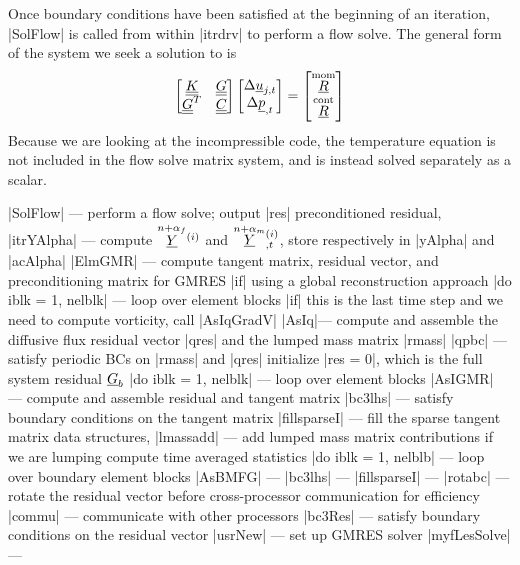 \documentclass[11pt]{article}
\begin{document}
Once boundary conditions have been satisfied at the beginning of an iteration, |SolFlow| is called from within |itrdrv| to perform a flow solve. The general form of the system we seek a solution to is
\begin{equation}
\begin{bmatrix}
\uul{K}   & \uul{G} \\
\uul{G}^T & \uul{C}
\end{bmatrix}
\begin{bmatrix}
\Delta \ul{u}_{j,t} \\
\Delta \ul{p}_{,t}
\end{bmatrix}
=
\begin{bmatrix}
\oset{\text{mom}}{\ul{R}} \\
\oset{\text{cont}}{\ul{R}}
\end{bmatrix}
\end{equation}
Because we are looking at the incompressible code, the temperature equation is not included in the flow solve matrix system, and is instead solved separately as a scalar.
\begin{outline}[deep]
\1 |SolFlow| --- perform a flow solve; output |res| preconditioned residual, 
	\2 |itrYAlpha| --- compute $\oset{n+\alpha_f}{\ul{Y}}^{(i)}$ and $\oset{n+\alpha_m}{\ul{Y}}^{(i)}_{,t}$, store respectively in |yAlpha| and |acAlpha|
	\2 |ElmGMR| --- compute tangent matrix, residual vector, and preconditioning matrix for GMRES
		\3 |if| using a global reconstruction approach
			\4 |do iblk = 1, nelblk| --- loop over element blocks
				\5 |if| this is the last time step and we need to compute vorticity, call |AsIqGradV|
				\5 |AsIq|\ra --- compute and assemble the diffusive flux residual vector |qres| and the lumped mass matrix |rmass|
			\4 |qpbc| --- satisfy periodic BCs on |rmass| and |qres|
		\3 initialize |res = 0|, which is the full system residual $\underline{G}_b$
		\3 |do iblk = 1, nelblk| --- loop over element blocks
			\4 |AsIGMR| --- compute and assemble residual and tangent matrix
			\4 |bc3lhs| --- satisfy boundary conditions on the tangent matrix
			\4 |fillsparseI| --- fill the sparse tangent matrix data structures, 
		\3 |lmassadd| --- add lumped mass matrix contributions if we are lumping
		\3 compute time averaged statistics
		\3 |do iblk = 1, nelblb| --- loop over boundary element blocks
			\4 |AsBMFG| ---
			\4 |bc3lhs| --- 
			\4 |fillsparseI| ---
		\3 |rotabc| --- rotate the residual vector before cross-processor communication for efficiency
		\3 |commu| --- communicate with other processors
		\3 |bc3Res| --- satisfy boundary conditions on the residual vector
	\2 |usrNew| --- set up GMRES solver
	\2 |myfLesSolve| --- 
\end{outline}
\end{document}
